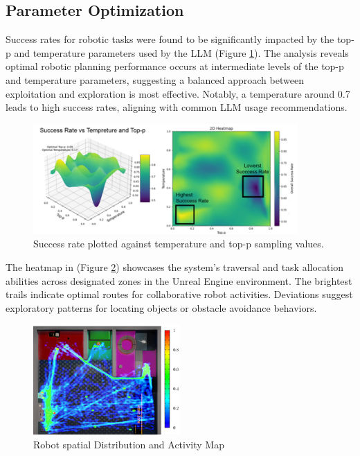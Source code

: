 \documentclass[pdflatex,sn-mathphys-num]{sn-jnl}
\theoremstyle{thmstyleone}
\theoremstyle{thmstyletwo}%
\theoremstyle{thmstylethree}%
\begin{document}
\subsection{Parameter Optimization}
Success rates for robotic tasks were found to be significantly impacted by the top-p and temperature parameters used by the LLM (Figure \ref{heat-map}).
The analysis reveals optimal robotic planning performance occurs at intermediate levels of the top-p and temperature parameters, suggesting a balanced approach between exploitation and exploration is most effective. Notably, a temperature around 0.7 leads to high success rates, aligning with common LLM usage recommendations.
\begin{figure}[H]
\centering
\includegraphics[width=0.9\textwidth]{figures/Picture1.png}
\caption{Success rate plotted against temperature and top-p sampling values.}\label{heat-map}
\end{figure}
The heatmap in (Figure \ref{spacial-map}) showcases the system's traversal and task allocation abilities across designated zones in the Unreal Engine environment.
The brightest trails indicate optimal routes for collaborative robot activities. Deviations suggest exploratory patterns for locating objects or obstacle avoidance behaviors.
\begin{figure}[H]
\centering
\includegraphics[width=0.5\textwidth]{figures/heatmap.png}
\caption{ Robot spatial Distribution and Activity Map}\label{spacial-map}
\end{figure}
\end{document}
